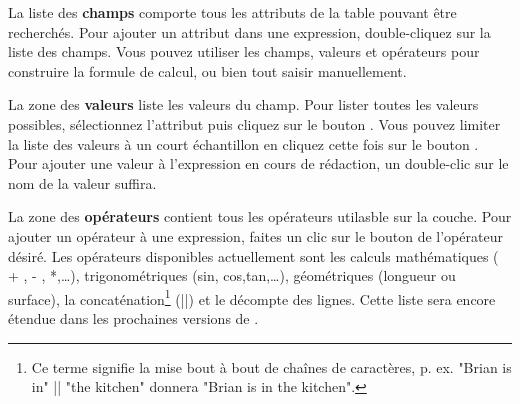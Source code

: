 La liste des \textbf{champs} comporte tous les attributs de la table pouvant 
être recherchés. Pour ajouter un attribut dans une expression, double-cliquez 
sur la liste des champs. Vous pouvez utiliser les champs, valeurs et opérateurs 
pour construire la formule de calcul, ou bien tout saisir manuellement.

La zone des \textbf{valeurs} liste les valeurs du champ. Pour lister toutes les 
valeurs possibles, sélectionnez l'attribut puis cliquez sur le bouton . 
Vous pouvez limiter la liste des valeurs à un court échantillon en cliquez cette 
fois sur le bouton . Pour ajouter une valeur à l'expression 
en cours de rédaction, un double-clic sur le nom de la valeur suffira.

La zone des \textbf{opérateurs} contient tous les opérateurs utilasble sur la 
couche. Pour ajouter un opérateur à une expression, faites un clic sur le bouton 
de l'opérateur désiré. Les opérateurs disponibles actuellement sont les calculs 
mathématiques ( + , - , *,\dots), trigonométriques (sin, cos,tan,\dots), 
géométriques (longueur ou surface), la concaténation\footnote{Ce terme signifie 
la mise bout à bout de chaînes de caractères, p. ex. "Brian is in" || "the kitchen" 
donnera "Brian is in the kitchen".} (||) et le décompte des lignes. Cette liste 
sera encore étendue dans les prochaines versions de \qg.

